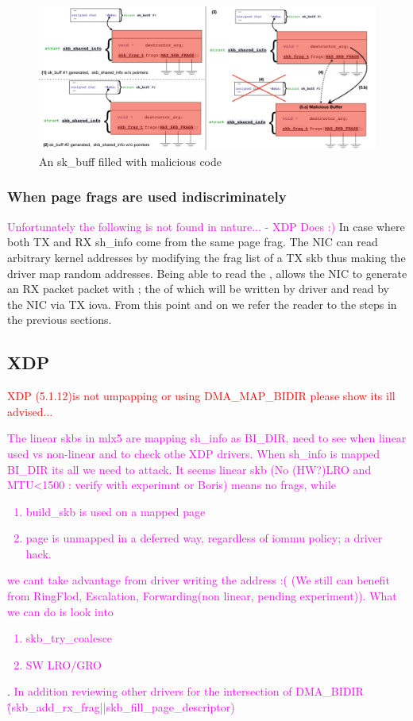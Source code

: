 \begin{figure}
    \centering
    \includegraphics[width=1.1\linewidth]{figs/gro_generation.pdf}
    \caption{An sk\_buff filled with malicious code}
    \label{fig:gro}
\end{figure}

\subsubsection{When page frags are used indiscriminately}
\textcolor{magenta}{Unfortunately the following is not found in nature... - XDP Does :)}\newline
In case where both TX and RX sh\_info come from the same page frag. The NIC can read arbitrary kernel addresses by modifying the frag list of a TX skb thus making the driver map random addresses.
Being able to read the \shinfo, allows the NIC to generate an RX packet packet with \mabaf; the \kva of which will be written by driver and read by the NIC via TX iova. From this point and on we refer the reader to the steps in the previous sections.
\subsection{XDP}
\textcolor{red}{XDP (5.1.12)is not umpapping or using DMA\_MAP\_BIDIR \- please show its ill advised...} \textcolor{magenta}{The linear skbs in mlx5 are mapping sh\_info as BI\_DIR, need to see when linear used vs non-linear and to check othe XDP drivers. When sh\_info is mapped BI\_DIR its all we need to attack.\newline
It seems linear skb (No (HW?)LRO and MTU<1500 : verify with experimnt or Boris) means no frags, while \begin{enumerate}
    \item build\_skb is used on a mapped page
    \item page is unmapped in a deferred way, regardless of iommu policy; a driver hack.
\end{enumerate} 
we cant take advantage from driver writing the \page address :( (We still can benefit from RingFlod, Escalation, Forwarding(non linear, pending experiment)). What we can do is look into \begin{enumerate}
    \item skb\_try\_coalesce
    \item SW LRO/GRO
\end{enumerate}}.
\newline
\textcolor{magenta}{In addition reviewing other drivers for the intersection of DMA\_BIDIR \^ (skb\_add\_rx\_frag||skb\_fill\_page\_descriptor)}
